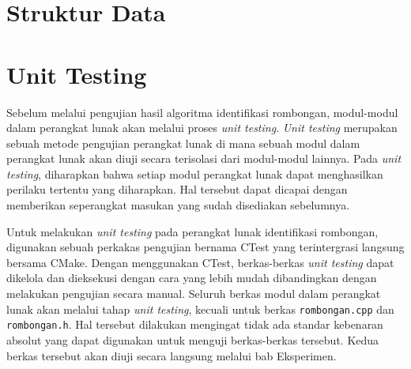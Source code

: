 \section{Struktur Data}
\label{sec:impl-struct}

\section{Unit Testing}
\label{sec:unit-test}

Sebelum melalui pengujian hasil algoritma identifikasi rombongan, modul-modul dalam perangkat lunak akan melalui proses \textit{unit testing}. \textit{Unit testing} merupakan sebuah metode pengujian perangkat lunak di mana sebuah modul dalam perangkat lunak akan diuji secara terisolasi dari modul-modul lainnya. Pada \textit{unit testing}, diharapkan bahwa setiap modul perangkat lunak dapat menghasilkan perilaku tertentu yang diharapkan. Hal tersebut dapat dicapai dengan memberikan seperangkat masukan yang sudah disediakan sebelumnya.

Untuk melakukan \textit{unit testing} pada perangkat lunak identifikasi rombongan, digunakan sebuah perkakas pengujian bernama CTest yang terintergrasi langsung bersama CMake. Dengan menggunakan CTest, berkas-berkas \textit{unit testing} dapat dikelola dan dieksekusi dengan cara yang lebih mudah dibandingkan dengan melakukan pengujian secara manual. Seluruh berkas modul dalam perangkat lunak akan melalui tahap \textit{unit testing}, kecuali untuk berkas \texttt{rombongan.cpp} dan \texttt{rombongan.h}. Hal tersebut dilakukan mengingat tidak ada standar kebenaran absolut yang dapat digunakan untuk menguji berkas-berkas tersebut. Kedua berkas tersebut akan diuji secara langsung melalui bab Eksperimen.